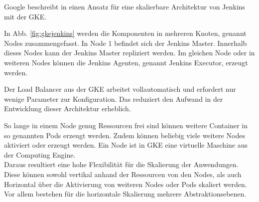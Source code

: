Google beschreibt in \cite{Google:GKEJenkins} einen Ansatz für eine skalierbare Architektur von Jenkins mit der \ac{GKE}.

In Abb. \ref{fig:gkejenkins} werden die Komponenten in mehreren Knoten, genannt Nodes zusammengefasst. In Node 1 befindet sich der Jenkins Master. Innerhalb dieses Nodes kann der Jenkins Master repliziert werden. Im gleichen Node oder in weiteren Nodes können die Jenkins Agenten, genannt Jenkins Executor, erzeugt werden.

Der Load Balancer aus der \ac{GKE} arbeitet vollautomatisch und erfordert nur wenige Parameter zur Konfiguration. Das reduziert den Aufwand in der Entwicklung dieser Architektur erheblich.

So lange in einem Node genug Ressourcen frei sind können weitere Container in so genannten Pods erzeugt werden. Zudem können beliebig viele weitere Nodes aktiviert oder erzeugt werden. Ein Node ist in \ac{GKE} eine virtuelle Maschine aus der Computing Engine.
\medskip
\\
Daraus resultiert eine hohe Flexibilität für die Skalierung der Anwendungen. Diese können sowohl vertikal anhand der Ressourcen von den Nodes, als auch Horizontal über die Aktivierung von weiteren Nodes oder Pods skaliert werden. Vor allem bestehen für die horizontale Skalierung mehrere Abstraktionsebenen.
